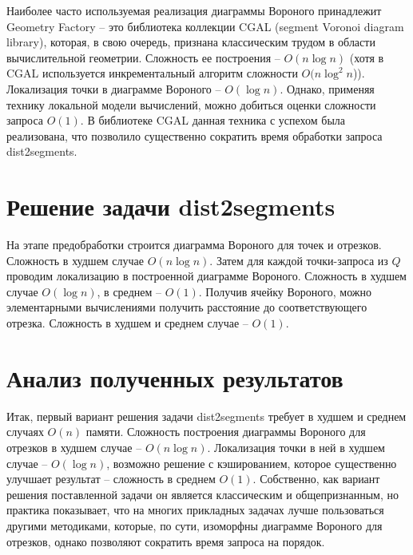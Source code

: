 Наиболее часто используемая реализация диаграммы Вороного принадлежит Geometry
Factory -- это библиотека коллекции CGAL \cite{CGAL} (segment Voronoi diagram library),
которая, в свою очередь, признана классическим трудом в области
вычислительной геометрии.
Сложность ее построения -- $O(n \log n)$ \cite{CGAL} (хотя в CGAL используется
инкрементальный алгоритм сложности $O(n \log^2 n$)). Локализация точки в диаграмме Вороного --
$O(\log n)$. Однако, применяя технику локальной модели вычислений, можно
добиться оценки сложности запроса $O(1)$.
В библиотеке CGAL данная техника с успехом была реализована, что
позволило существенно сократить время обработки запроса dist2segments.

\FloatBarrier
\section{Решение задачи dist2segments}

На этапе предобработки строится диаграмма Вороного для точек и отрезков.
Сложность в худшем случае $O(n \log n)$. Затем для каждой точки-запроса из $Q$
проводим локализацию в построенной диаграмме Вороного. Сложность в
худшем случае $O(\log n)$, в среднем -- $O(1)$. Получив ячейку Вороного, можно
элементарными вычислениями получить расстояние до соответствующего
отрезка. Сложность в худшем и среднем случае -- $O(1)$.

\FloatBarrier
\section{Анализ полученных результатов}

Итак, первый вариант решения задачи dist2segments требует в худшем и
среднем случаях $O(n)$ памяти. Сложность построения диаграммы Вороного для отрезков
 в худшем случае -- $O(n \log n)$. Локализация точки в ней в худшем случае -- $O(\log n)$, 
возможно решение с кэшированием, которое существенно улучшает результат --
сложность в среднем $O(1)$. Собственно, как вариант решения поставленной
задачи он является классическим и общепризнанным, но практика показывает,
что на многих прикладных задачах лучше пользоваться другими методиками,
которые, по сути, изоморфны диаграмме Вороного для отрезков, однако позволяют сократить время 
запроса на порядок.

\FloatBarrier
